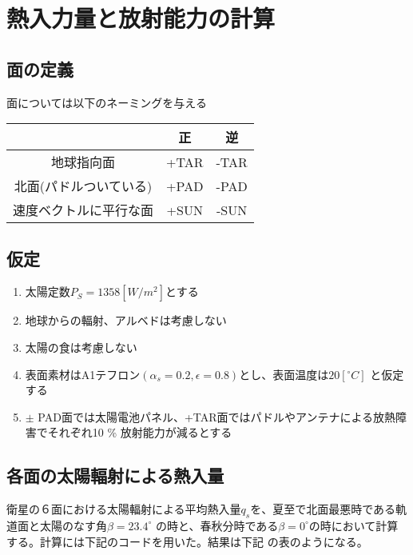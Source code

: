 \documentclass[15pt,uplatex,dvipdfmx]{jsarticle}
\begin{document}
\setcounter{section}{1}

\section{熱入力量と放射能力の計算}
\subsection{面の定義}
面については以下のネーミングを与える\par
\setlength{\parskip}{1.0\baselineskip}

\setlength{\tabcolsep}{.5zw}
\begin{table}[H]
\begin{tabularx}{40zw}{C|C C} \hline
   & 正 & 逆 \\ \hline
  地球指向面 & +TAR & -TAR \\ \hline
  北面(パドルついている) & +PAD & -PAD \\ \hline
  速度ベクトルに平行な面 & +SUN & -SUN \\ \hline
\end{tabularx}
\end{table}

\subsection{仮定}
\setlength{\parskip}{0\baselineskip}
\begin{enumerate}
  \item 太陽定数$P_S = 1358[W/m^2]$とする
  \item 地球からの輻射、アルベドは考慮しない
  \item 太陽の食は考慮しない
  \item 表面素材はA1テフロン$(\alpha _s = 0.2, \epsilon = 0.8)$とし、表面温度は$20[^ \circ C]$
  と仮定する
  \item $\pm$ PAD面では太陽電池パネル、+TAR面ではパドルやアンテナによる放熱障害でそれぞれ10 \%
  放射能力が減るとする
\end{enumerate}

\subsection{各面の太陽輻射による熱入量}
\setlength{\parskip}{0\baselineskip}
衛星の６面における太陽輻射による平均熱入量$q_s$を、夏至で北面最悪時である軌道面と太陽のなす角$\beta = 23.4 ^ \circ$
の時と、春秋分時である$\beta = 0 ^ \circ$の時において計算する。計算には下記のコードを用いた。結果は下記
の表のようになる。\par
\setlength{\parskip}{1.0\baselineskip}
\end{document}
